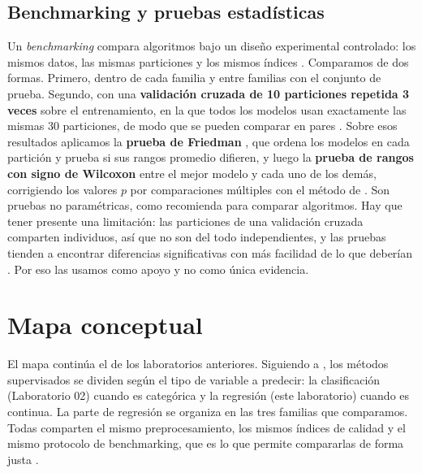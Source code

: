 \documentclass[11pt,a4paper]{article}
\let\citepOriginal\citep
\renewcommand*{\citep}[1]{\textbf{\citepOriginal{#1}}}%
\let\citetOriginal\citet
\renewcommand*{\citet}[1]{\textbf{\citetOriginal{#1}}}%
\begin{document}
\subsection{Benchmarking y pruebas estadísticas}
Un \textit{benchmarking} compara algoritmos bajo un diseño experimental controlado: los mismos datos, las mismas particiones y los mismos índices \citep{hothorn2005}. Comparamos de dos formas. Primero, dentro de cada familia y entre familias con el conjunto de prueba. Segundo, con una \textbf{validación cruzada de 10 particiones repetida 3 veces} sobre el entrenamiento, en la que todos los modelos usan exactamente las mismas 30 particiones, de modo que se pueden comparar en pares \citep{kohavi1995}. Sobre esos resultados aplicamos la \textbf{prueba de Friedman} \citep{friedman1937}, que ordena los modelos en cada partición y prueba si sus rangos promedio difieren, y luego la \textbf{prueba de rangos con signo de Wilcoxon} \citep{wilcoxon1945} entre el mejor modelo y cada uno de los demás, corrigiendo los valores $p$ por comparaciones múltiples con el método de \citet{holm1979}. Son pruebas no paramétricas, como recomienda \citet{demsar2006} para comparar algoritmos. Hay que tener presente una limitación: las particiones de una validación cruzada comparten individuos, así que no son del todo independientes, y las pruebas tienden a encontrar diferencias significativas con más facilidad de lo que deberían \citep{dietterich1998,nadeau2003}. Por eso las usamos como apoyo y no como única evidencia.
\section{Mapa conceptual}

El mapa continúa el de los laboratorios anteriores. Siguiendo a \citet{james2013}, los métodos supervisados se dividen según el tipo de variable a predecir: la clasificación (Laboratorio 02) cuando es categórica y la regresión (este laboratorio) cuando es continua. La parte de regresión se organiza en las tres familias que comparamos. Todas comparten el mismo preprocesamiento, los mismos índices de calidad y el mismo protocolo de benchmarking, que es lo que permite compararlas de forma justa \citep{hothorn2005}.
\end{document}
